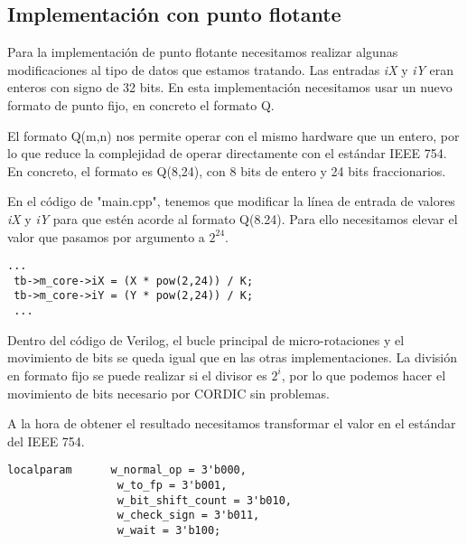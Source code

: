 \subsection{Implementación con punto flotante}
Para la implementación de punto flotante necesitamos realizar algunas modificaciones al tipo de datos que estamos tratando. Las entradas \textit{iX} y \textit{iY} eran enteros con signo de 32 bits. En esta implementación necesitamos usar un nuevo formato de punto fijo, en concreto el formato Q.

El formato Q(m,n) nos permite operar con el mismo hardware que un entero, por lo que reduce la complejidad de operar directamente con el estándar IEEE 754. En concreto, el formato es Q(8,24), con 8 bits de entero y 24 bits fraccionarios.

En el código de "main.cpp", tenemos que modificar la línea de entrada de valores \textit{iX} y \textit{iY} para que estén acorde al formato Q(8.24). Para ello necesitamos elevar el valor que pasamos por argumento a $2^{24}$.

\begin{lstlisting}[caption={Cambios de entrada de valores de C++ a Verilog en la implementación de Punto Flotante}]
 ...
 tb->m_core->iX = (X * pow(2,24)) / K;  
 tb->m_core->iY = (Y * pow(2,24)) / K;
 ...
\end{lstlisting}

Dentro del código de Verilog, el bucle principal de micro-rotaciones y el movimiento de bits se queda igual que en las otras implementaciones. La división en formato fijo se puede realizar si el divisor es $2^i$, por lo que podemos hacer el movimiento de bits necesario por CORDIC sin problemas.

A la hora de obtener el resultado necesitamos transformar el valor en el estándar del IEEE 754.

\begin{lstlisting}[caption={Parámetros de estado para controlar la máquina de estado finita.}]
 localparam      w_normal_op = 3'b000,
                 w_to_fp = 3'b001,
                 w_bit_shift_count = 3'b010,
                 w_check_sign = 3'b011,
                 w_wait = 3'b100;

\end{lstlisting}






